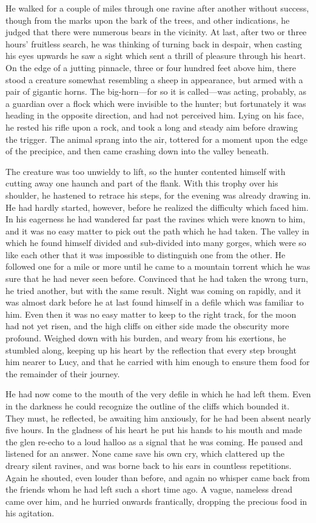 \documentclass[12pt]{book}
\begin{document}
He walked for a couple of miles through one ravine after another without success, though from the marks upon the bark of the trees, and other indications, he judged that there were numerous bears in the vicinity. At last, after two or three hours’ fruitless search, he was thinking of turning back in despair, when casting his eyes upwards he saw a sight which sent a thrill of pleasure through his heart. On the edge of a jutting pinnacle, three or four hundred feet above him, there stood a creature somewhat resembling a sheep in appearance, but armed with a pair of gigantic horns. The big-horn—for so it is called—was acting, probably, as a guardian over a flock which were invisible to the hunter; but fortunately it was heading in the opposite direction, and had not perceived him. Lying on his face, he rested his rifle upon a rock, and took a long and steady aim before drawing the trigger. The animal sprang into the air, tottered for a moment upon the edge of the precipice, and then came crashing down into the valley beneath. 

The creature was too unwieldy to lift, so the hunter contented himself with cutting away one haunch and part of the flank. With this trophy over his shoulder, he hastened to retrace his steps, for the evening was already drawing in. He had hardly started, however, before he realized the difficulty which faced him. In his eagerness he had wandered far past the ravines which were known to him, and it was no easy matter to pick out the path which he had taken. The valley in which he found himself divided and sub-divided into many gorges, which were so like each other that it was impossible to distinguish one from the other. He followed one for a mile or more until he came to a mountain torrent which he was sure that he had never seen before. Convinced that he had taken the wrong turn, he tried another, but with the same result. Night was coming on rapidly, and it was almost dark before he at last found himself in a defile which was familiar to him. Even then it was no easy matter to keep to the right track, for the moon had not yet risen, and the high cliffs on either side made the obscurity more profound. Weighed down with his burden, and weary from his exertions, he stumbled along, keeping up his heart by the reflection that every step brought him nearer to Lucy, and that he carried with him enough to ensure them food for the remainder of their journey. 

He had now come to the mouth of the very defile in which he had left them. Even in the darkness he could recognize the outline of the cliffs which bounded it. They must, he reflected, be awaiting him anxiously, for he had been absent nearly five hours. In the gladness of his heart he put his hands to his mouth and made the glen re-echo to a loud halloo as a signal that he was coming. He paused and listened for an answer. None came save his own cry, which clattered up the dreary silent ravines, and was borne back to his ears in countless repetitions. Again he shouted, even louder than before, and again no whisper came back from the friends whom he had left such a short time ago. A vague, nameless dread came over him, and he hurried onwards frantically, dropping the precious food in his agitation. 
\end{document}
